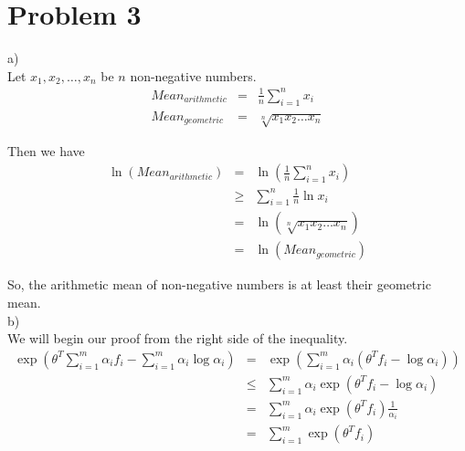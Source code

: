 \documentclass[12pt]{article}
\begin{document}
\section*{Problem 3}

a) \\
Let $x_1, x_2, \dots, x_n$ be $n$ non-negative numbers.
\begin{eqnarray*}
  Mean_{arithmetic} &=& \frac{1}{n} \sum_{i=1}^n x_i \\
  Mean_{geometric} &=& \sqrt[n] {x_1x_2 \dots x_n}
\end{eqnarray*}

Then we have
\begin{eqnarray*}
  \ln { \left( Mean_{arithmetic} \right) }
  &=& \ln { \left( \frac{1}{n} \sum_{i=1}^n x_i \right) } \\
  &\ge& \sum_{i=1}^n \frac{1}{n} \ln {  x_i } \\
  &=& \ln { \left( \sqrt[n] {x_1x_2 \dots x_n} \right) } \\
  &=& \ln { \left( Mean_{geometric} \right) }
\end{eqnarray*}

So, the arithmetic mean of non-negative numbers is at least their geometric mean. \\

b) \\
We will begin our proof from the right side of the inequality.
\begin{eqnarray*}
  \exp { \left( \theta^T \sum_{i=1}^m \alpha_i f_i
    - \sum_{i=1}^m \alpha_i \log {\alpha_i} \right) }
  &=& \exp { \left( \sum_{i=1}^m \alpha_i (\theta^T f_i - \log {\alpha_i})
    \right) } \\
  &\le& \sum_{i=1}^m \alpha_i \exp { \left( 
      \theta^T f_i - \log {\alpha_i} \right) } \\
  &=& \sum_{i=1}^m \alpha_i \exp { \left( \theta^T f_i \right) }
  \frac {1}{\alpha_i} \\
  &=& \sum_{i=1}^m \exp { \left( \theta^T f_i \right) }
\end{eqnarray*}
\end{document}
